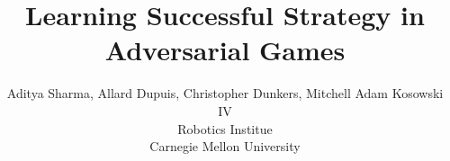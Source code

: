 \documentclass[10pt,twocolumn,letterpaper]{article}
\begin{document}
\title{Learning Successful Strategy in Adversarial Games }

\author{Aditya Sharma, Allard Dupuis, Christopher Dunkers, Mitchell Adam Kosowski IV\\
Robotics Institue\\
Carnegie Mellon University\\
}


\maketitle




%


%


   

{\small


}
\end{document}
